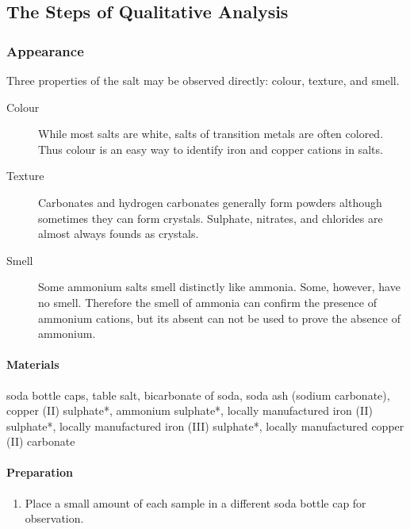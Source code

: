 
\subsection{The Steps of Qualitative Analysis}
\setcounter{secnumdepth}{3}
\subsubsection{Appearance}

Three properties of the salt may be observed directly: colour, texture, and smell.
\begin{description}

\item[Colour]{While most salts are white, salts of transition metals are often colored. Thus colour is an easy way to identify iron and copper cations in salts.}

\item[Texture]{Carbonates and hydrogen carbonates generally form powders although sometimes they can form crystals. Sulphate, nitrates, and chlorides are almost always founds as crystals.}

\item[Smell]{Some ammonium salts smell distinctly like ammonia. Some, however, have no smell. Therefore the smell of ammonia can confirm the presence of ammonium cations, but its absent can not be used to prove the absence of ammonium.}

\end{description}

\paragraph{Materials}
soda bottle caps, table salt, bicarbonate of soda, soda ash (sodium carbonate), copper (II) sulphate*, ammonium sulphate*, locally manufactured iron (II) sulphate*, locally manufactured iron (III) sulphate*, locally manufactured copper (II) carbonate

\paragraph{Preparation}
\begin{enumerate}
\item{Place a small amount of each sample in a different soda bottle cap for observation.}
\end{enumerate}

